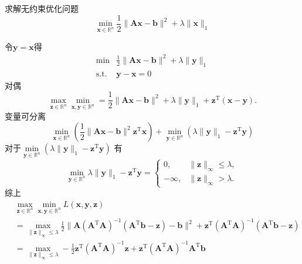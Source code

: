 \begin{example}
    求解无约束优化问题
    \[
        \min_{\boldsymbol{x}\in\mathbb{R}^n}\frac12\|\boldsymbol{A}\boldsymbol{x}-\boldsymbol{b}\|^2+\lambda\|\boldsymbol{x}\|_1
    \]
    \begin{solution}
        令$\boldsymbol{y} = \boldsymbol{x}$得
        \[
            \begin{array}{rl}
                \min&\frac12\|\boldsymbol{A}\boldsymbol{x}-\boldsymbol{b}\|^2+\lambda\|\boldsymbol{y}\|_1\\
                \mathrm{s.t.}&\boldsymbol{y}-\boldsymbol{x}=0
            \end{array}
        \]
        对偶
        \[
            \max_{\boldsymbol{z}\in\mathbb{R}^n}\min_{\boldsymbol{x},\boldsymbol{y}\in\mathbb{R}^n} =\frac12\|\boldsymbol{A}\boldsymbol{x}-\boldsymbol{b}\|^2+\lambda\|\boldsymbol{y}\|_1+\boldsymbol{z}^{\mathrm{T}}(\boldsymbol{x}-\boldsymbol{y}).
        \]
        变量可分离
        \[
            \boxed{\min_{\boldsymbol{x}\in\mathbb{R}^n}\left(\frac12\|\boldsymbol{Ax}-\boldsymbol{b}\|^2\boldsymbol{z}^{\mathrm{T}} \boldsymbol{x}\right)}+\boxed{\min_{\boldsymbol{y}\in\mathbb{R}^n}\left(\lambda\|\boldsymbol{y}\|_1-\boldsymbol{z}^{\mathrm{T}} \boldsymbol{y}\right)}
        \]
        对于$\min\limits_{\boldsymbol{y}\in\mathbb{R}^n}\left(\lambda\|\boldsymbol{y}\|_1-\boldsymbol{z}^{\mathrm{T}} \boldsymbol{y}\right)$
        有
        \[
            \min_{\boldsymbol{y}\in\mathbb{R}^n}\lambda\|\boldsymbol{y}\|_1-\boldsymbol{z}^{\mathrm{T}}\boldsymbol{y}=
            \begin{cases}
                0,& \|\boldsymbol{z}\|_\infty\leqslant\lambda,\\
                -\infty,& \|\boldsymbol{z}\|_\infty>\lambda.
            \end{cases}
        \]
        综上
        \[
            \begin{aligned}
                &\max_{\boldsymbol{z}\in\mathbb{R}^n}\min_{\boldsymbol{x},\boldsymbol{y}\in\mathbb{R}^n}L(\boldsymbol{x},\boldsymbol{y},\boldsymbol{z})\\
                &=\max_{\|\boldsymbol{z}\|_\infty\leqslant\lambda}\frac12\|\boldsymbol{A}(\boldsymbol{A}^{\mathrm{T}}\boldsymbol{A})^{-1}(\boldsymbol{A}^{\mathrm{T}}\boldsymbol{b}-\boldsymbol{z})-\boldsymbol{b}\|^2+\boldsymbol{z}^{\mathrm{T}}(\boldsymbol{A}^{\mathrm{T}}\boldsymbol{A})^{-1}(\boldsymbol{A}^{\mathrm{T}}\boldsymbol{b}-\boldsymbol{z})\\
                &=\max_{\|\boldsymbol{z}\|_\infty\leqslant\lambda}-\frac12\boldsymbol{z}^{\mathrm{T}}(\boldsymbol{A}^{\mathrm{T}}\boldsymbol{A})^{-1}\boldsymbol{z}+\boldsymbol{z}^{\mathrm{T}}(\boldsymbol{A}^{\mathrm{T}}\boldsymbol{A})^{-1}\boldsymbol{A}^{\mathrm{T}}\boldsymbol{b}\\

\end{aligned}\]
\end{solution}
\end{example}

